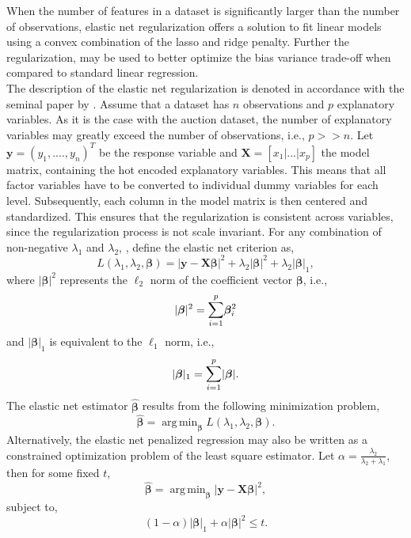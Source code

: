 \documentclass[a4paper,12pt, headsepline]{scrartcl}
\DeclareMathOperator*{\argminA}{arg\,min}
\numberwithin{equation}{section}
\begin{document}
When the number of features in a dataset is significantly larger than the number of observations, elastic net regularization offers a solution to fit linear models using a convex combination of the lasso and ridge penalty. Further the regularization, may be used to better optimize the bias variance trade-off when compared to standard linear regression.\\
The description of the elastic net regularization is denoted in accordance with the seminal paper by \citet{hastie03}. Assume that a dataset has $n$ observations and $p$ explanatory variables. As it is the case with the auction dataset, the number of explanatory variables may greatly exceed the number of observations, i.e., $p >> n$. Let $\mathbf{y} = (y_1, ...., y_n)^T$ be the response variable and $\mathbf{X} = [x_1|...|x_p]$ the model matrix, containing the hot encoded explanatory variables. This means that all factor variables have to be converted to individual dummy variables for each level. Subsequently, each column in the model matrix is then centered and standardized. This ensures that the regularization is consistent across variables, since the regularization process is not scale invariant. For any combination of non-negative $\lambda_1$ and $\lambda_2$, \citet{hastie03}, define the elastic net criterion as,
\[
L(\lambda_1, \lambda_2, \bm{\beta}) = |\mathbf{y} - \mathbf{X}\bm{\beta}|^2 +\lambda_2|\bm{\beta}|^2 +\lambda_2|\bm{\beta}|_1, 
\]
where $|\bm{\beta}|^2$ represents the $\ell_2$ norm of the coefficient vector $\bm{\beta}$, i.e., 
\[
|\bm{\beta}|^2 = \mathlarger{\sum}\limits_{i = 1}^{p}\bm{\beta}_i^2
\]
and $|\bm{\beta}|_1$ is equivalent to the $\ell_1$ norm, i.e.,  
\[
|\bm{\beta}|_1 = \mathlarger{\sum}\limits_{i = 1}^{p}|\bm{\beta}|.
\]
The elastic net estimator $\bm{\hat{\beta}}$ results from the following minimization problem,
\[
\bm{\hat{\beta}} = \argminA_{\bm{\beta}} L(\lambda_1, \lambda_2, \bm{\beta}).
\]
Alternatively, the elastic net penalized regression may also be written as a constrained optimization problem of the least square estimator. Let $\alpha = \frac{\lambda_2}{\lambda_2 + \lambda_1}$, then for some fixed $t$, 
\[
\bm{\hat{\beta}} = \argminA_{\bm{\beta}} |\mathbf{y} - \mathbf{X}\bm{\beta}|^2,
\]
subject to,
\[
(1 - \alpha)|\bm{\beta}|_1 + \alpha|\bm{\beta}|^2 \leq t.
\]
\end{document}
